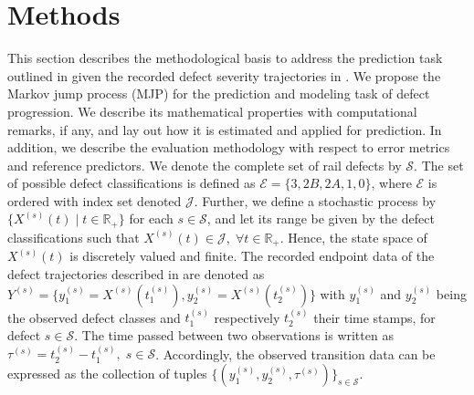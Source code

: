 
 
\section{Methods} \label{sec:methods}
This section describes the methodological basis to address the prediction task outlined in  given the recorded defect severity trajectories in . 
We propose the Markov jump process (MJP) for the prediction and modeling task of defect progression.
We describe its mathematical properties with computational remarks, if any, and lay out how it is estimated and applied for prediction. In addition, we describe the evaluation methodology with respect to error metrics and reference predictors. 
We denote the complete set of rail defects by $\mathcal{S}$. The set of possible defect classifications is defined as $\mathcal{E} = \{3, 2B, 2A, 1, 0\}$, where $\mathcal{E}$ is ordered with index set denoted $\mathcal{J}$.
Further, we define a stochastic process by $\{ X^{(s)}(t) \; \vert \; t \in \mathbb R_+\}$ for each $s \in \mathcal{S}$, and let its range be given by the defect classifications such that $ X^{(s)}(t) \in \mathcal{J}, \; \forall t \in \mathbb R_+$. Hence, the state space of $X^{(s)}(t)$ is discretely valued and finite. 
The recorded endpoint data of the defect trajectories described in  are denoted as $Y^{(s)} = \{ y_1^{(s)} = X^{(s)}(t_1^{(s)}), y_2^{(s)} = X^{(s)}(t_2^{(s)}) \}$ with $y_1^{(s)}$ and $y_2^{(s)}$ being the observed defect classes and $t_1^{(s)}$ respectively $t_2^{(s)}$ their time stamps, for defect $s \in \mathcal{S}$. The time passed between two observations is written as $\tau^{(s)} = t_2^{(s)} - t_1^{(s)}, \; s \in \mathcal{S}$. Accordingly, the observed transition data can be expressed as the collection of tuples $\{ ( y_1^{(s)}, y_2^{(s)}, \tau^{(s)} ) \}_{s \in \mathcal{S}}$. 




